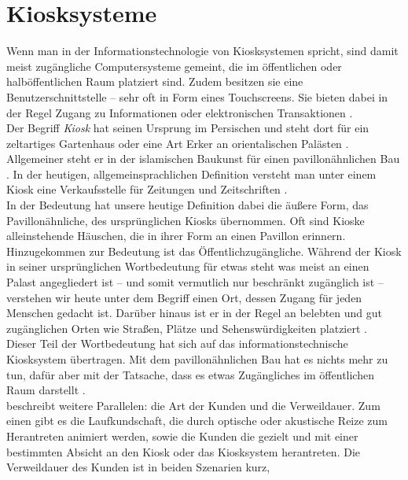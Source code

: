 \section{Kiosksysteme}
\label{sec:kiosk}

Wenn man in der Informationstechnologie von Kiosksystemen spricht,
sind damit meist zugängliche Computersysteme gemeint, die im öffentlichen oder halböffentlichen 
Raum platziert sind. Zudem besitzen sie eine Benutzerschnittstelle -- sehr oft in Form
eines Touchscreens. Sie bieten dabei in der Regel Zugang zu Informationen 
oder elektronischen Transaktionen \cite{retailing}.\\

Der Begriff \emph{Kiosk} hat seinen Ursprung im Persischen und steht dort für
ein zeltartiges Gartenhaus oder eine Art Erker an orientalischen Palästen \cite{meyers}.
Allgemeiner steht er in der islamischen Baukunst für einen pavillonähnlichen Bau \cite{taschenlexikon}.
In der heutigen, allgemeinsprachlichen Definition versteht man unter einem Kiosk eine Verkaufsstelle
für Zeitungen und Zeitschriften \cite{taschenlexikon, meyers}.\\
In der Bedeutung hat unsere heutige Definition dabei die äußere Form, das Pavillonähnliche, 
des ursprünglichen Kiosks übernommen. Oft sind Kioske alleinstehende Häuschen, die in ihrer Form
an einen Pavillon erinnern. Hinzugekommen zur Bedeutung ist das Öffentlichzugängliche. Während der Kiosk 
in seiner ursprünglichen Wortbedeutung für etwas steht was meist an einen Palast angegliedert ist -- und 
somit vermutlich nur beschränkt zugänglich ist -- verstehen wir heute unter dem Begriff einen Ort, dessen Zugang
für jeden Menschen gedacht ist. Darüber hinaus ist er in der Regel an belebten und gut zugänglichen Orten 
wie Straßen, Plätze und Sehenswürdigkeiten platziert \cite{multimediale}.\\
Dieser Teil der Wortbedeutung hat sich auf das informationstechnische Kiosksystem übertragen. Mit dem 
pavillonähnlichen Bau hat es nichts mehr zu tun, dafür aber mit der Tatsache, dass es etwas Zugängliches 
im öffentlichen Raum darstellt \cite{multimediale}.\\
 beschreibt weitere Parallelen: die Art der Kunden und 
die Verweildauer. Zum einen gibt es die Laufkundschaft, die durch optische oder akustische Reize
zum Herantreten animiert werden, sowie die Kunden die gezielt und mit einer bestimmten Absicht an den Kiosk
oder das Kiosksystem herantreten. Die Verweildauer des Kunden ist in beiden Szenarien kurz, 
